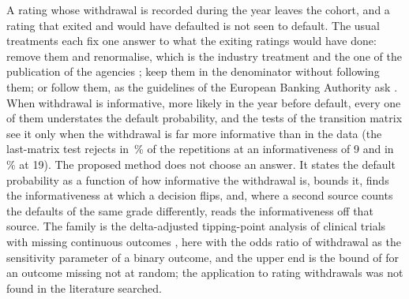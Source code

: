 A rating whose withdrawal is recorded during the year leaves the cohort, and a rating that exited and would have defaulted is not seen to default. The usual treatments each fix one answer to what the exiting ratings would have done: remove them and
renormalise, which is the industry treatment and the one of the publication of the agencies \citep{ratings:cerep}; keep them in the denominator without following them; or follow them, as the guidelines of the European Banking Authority ask \citep{validation-tests:eba2018gl1716}. When withdrawal is informative, more likely in the
year before default, every one of them understates the default probability, and the tests of the transition matrix see it only when the withdrawal is far more informative than in the data (the last-matrix test rejects in \pxPpFourMr{}\,\% of the repetitions at an informativeness of 9 and in \pxPpFourMrNineteen{}\,\% at 19). The proposed method does not choose an answer. It states the default probability as a function of how informative the withdrawal is, bounds it, finds the informativeness at which a decision flips, and, where a second source counts the defaults of the
same grade differently, reads the informativeness off that source. The family is the delta-adjusted tipping-point analysis of clinical trials with missing continuous outcomes \citep{proposed:cro2020}, here with the odds ratio of withdrawal as the sensitivity parameter of a binary outcome, and the upper end is the bound of \citet{proposed:manski1989} for an outcome missing not at random; the application to rating withdrawals was not found in the literature searched.

